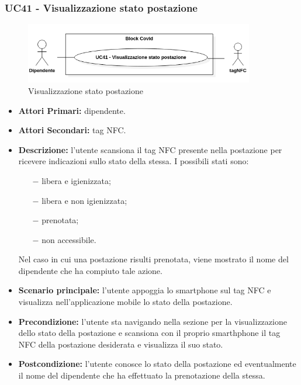 \subsubsection{ UC41 - Visualizzazione stato postazione}
\begin{figure}[H]
	\centering
	\includegraphics[width=10cm]{res/images/UC41.png}
	\caption{Visualizzazione stato postazione}
	\label{fig:Visualizzazione stato postazione}
\end{figure}
\begin{itemize}
	\item\textbf{Attori Primari:} dipendente.
	\item\textbf{Attori Secondari:} tag NFC.
	\item\textbf{Descrizione:} l’utente scansiona il tag NFC presente nella postazione per ricevere indicazioni sullo stato della stessa. I possibili stati sono:
	\begin{itemize}
		\item[$-$]libera e igienizzata;
		\item[$-$]libera e non igienizzata;
		\item[$-$]prenotata;
		\item[$-$]non accessibile.
	\end{itemize}
	Nel caso in cui una postazione risulti prenotata, viene mostrato il nome del dipendente che ha compiuto tale azione.
	\item\textbf{Scenario principale:} l’utente appoggia lo smartphone sul tag NFC e visualizza nell'applicazione mobile lo stato della postazione. 
	\item\textbf{Precondizione:} l’utente sta navigando nella sezione per la visualizzazione dello stato della postazione e 
	scansiona con il proprio smarthphone il tag NFC della postazione desiderata e visualizza il suo stato.
	\item\textbf{Postcondizione:} l’utente conosce lo stato della postazione ed eventualmente il nome del dipendente che ha effettuato la prenotazione della stessa.
\end{itemize}

